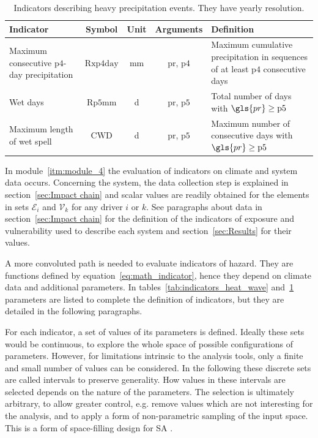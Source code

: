 \begin{table}
  \renewcommand*{\arraystretch}{1.5}
  \centering
  \caption{Indicators describing heavy precipitation events. They have yearly resolution.}
  \label{tab:indicators_heavy_precipitation}
  \begin{tabular}{p{}cccp{}}
    Indicator                                           & Symbol             & Unit                & Arguments               & Definition                                                                               \\
    \hline
    Maximum consecutive $\mathrm{p4}$-day precipitation & $\mathrm{Rxp4day}$ & \unit{\milli\metre} & \gls{pr}, $\mathrm{p4}$ & Maximum cumulative precipitation in sequences of at least $\mathrm{p4}$ consecutive days \\
    Wet days                                            & $\mathrm{Rp5mm}$   & \unit{\day}         & \gls{pr}, $\mathrm{p5}$ & Total number of days with $\gls{pr} \geq \mathrm{p5}$                                    \\
    Maximum length of wet spell                         & $\mathrm{CWD}$     & \unit{\day}         & \gls{pr}, $\mathrm{p5}$ & Maximum number of consecutive days with $\gls{pr} \geq \mathrm{p5}$                      \\
  \end{tabular}
\end{table}

In module~\ref{itm:module_4} the evaluation of \glspl{indicator} on climate and system data occurs. Concerning the system, the data collection step is explained in section~\ref{sec:Impact chain} and scalar values are readily obtained for the elements in sets $\mathcal{E}_i$ and $\mathcal{V}_k$ for any \gls{driver} $i$ or $k$. See paragraphs about data in section~\ref{sec:Impact chain} for the definition of the \glspl{indicator} of \gls{exposure} and \gls{vulnerability} used to describe each system and section~\ref{sec:Results} for their values.

A more convoluted path is needed to evaluate \glspl{indicator} of \gls{hazard}. They are functions defined by equation~\eqref{eq:math_indicator}, hence they depend on climate data and additional parameters. In tables~\ref{tab:indicators_heat_wave} and~\ref{tab:indicators_heavy_precipitation} parameters are listed to complete the definition of indicators, but they are detailed in the following paragraphs.

For each \gls{indicator}, a set of values of its parameters is defined. Ideally these sets would be continuous, to explore the whole space of possible configurations of parameters. However, for limitations intrinsic to the analysis tools, only a finite and small number of values can be considered. In the following these discrete sets are called intervals to preserve generality.
How values in these intervals are selected depends on the nature of the parameters. The selection is ultimately arbitrary, to allow greater control, e.g. remove values which are not interesting for the analysis, and to apply a form of non-parametric sampling of the input space. This is a form of space-filling design for \gls{SA} \cite[593-594]{2015DeanHandbookOf}.

